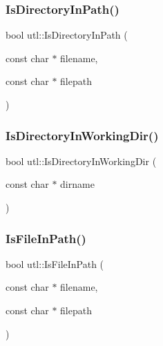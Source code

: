\mbox{\label{namespaceutl_a57a0860162f815b9ca54137b8f92f051}} 
\subsubsection{\texorpdfstring{Is\+Directory\+In\+Path()}{IsDirectoryInPath()}}
{\footnotesize\ttfamily bool utl\+::\+Is\+Directory\+In\+Path (\begin{DoxyParamCaption}\item[{const char $\ast$}]{filename,  }\item[{const char $\ast$}]{filepath }\end{DoxyParamCaption})}

\mbox{\label{namespaceutl_a08653a6121d035c63a92c85dd6c4a7cb}} 
\subsubsection{\texorpdfstring{Is\+Directory\+In\+Working\+Dir()}{IsDirectoryInWorkingDir()}}
{\footnotesize\ttfamily bool utl\+::\+Is\+Directory\+In\+Working\+Dir (\begin{DoxyParamCaption}\item[{const char $\ast$}]{dirname }\end{DoxyParamCaption})}

\mbox{\label{namespaceutl_adfea5967bd695c054be448927fc5cdf3}} 
\subsubsection{\texorpdfstring{Is\+File\+In\+Path()}{IsFileInPath()}}
{\footnotesize\ttfamily bool utl\+::\+Is\+File\+In\+Path (\begin{DoxyParamCaption}\item[{const char $\ast$}]{filename,  }\item[{const char $\ast$}]{filepath }\end{DoxyParamCaption})}


